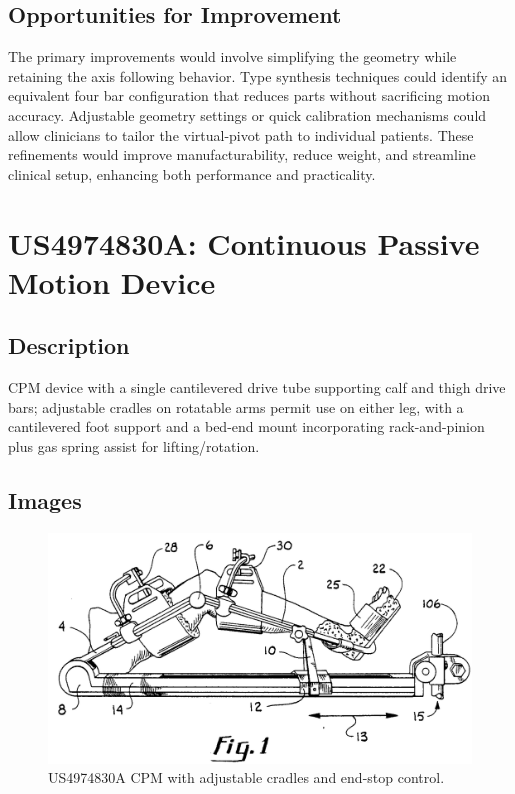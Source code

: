 \documentclass[11pt]{article}
\begin{document}
\subsection{Opportunities for Improvement}
The primary improvements would involve simplifying the geometry while retaining the axis following behavior. Type synthesis techniques could identify an equivalent four bar configuration that reduces parts without sacrificing motion accuracy. Adjustable geometry settings or quick calibration mechanisms could allow clinicians to tailor the virtual-pivot path to individual patients. These refinements would improve manufacturability, reduce weight, and streamline clinical setup, enhancing both performance and practicality.

\section{US4974830A: Continuous Passive Motion Device}
\subsection{Description}
CPM device with a single cantilevered drive tube supporting calf and thigh drive bars; adjustable cradles on rotatable arms permit use on either leg, with a cantilevered foot support and a bed-end mount incorporating rack-and-pinion plus gas spring assist for lifting/rotation.
\subsection{Images}
\begin{figure}[H]
  \centering
  \includegraphics[width=0.54\linewidth]{US4974830_1.png}
  \caption{US4974830A CPM with adjustable cradles and end-stop control.}
  \label{fig:US4974830A}
\end{figure}
\end{document}
